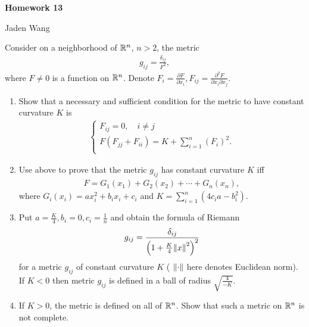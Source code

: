 \documentclass[12pt]{article}
\begin{document}
\centerline {\textsf{\textbf{\LARGE{Homework 13}}}}
\centerline {Jaden Wang}
\vspace{.15in}
\begin{problem}[Do Carmo 8.1]
Consider on a neighborhood of $ \mathbb{R}^{n}$, $ n>2$, the metric
 \begin{align*}
	g_{ij} = \frac{\delta_{ij}}{ F^2},
\end{align*}
where $ F \neq 0$ is a function on  $ \mathbb{R}^{n}$. Denote $ F_i = \frac{\partial F}{\partial x_i}, F_{ij} = \frac{\partial^2 F}{\partial { x_i} \partial x_j}  $.
\begin{enumerate}[label=(\alph*)]
	\item Show that a necessary and sufficient condition for the metric to have constant curvature $ K$ is
	 \begin{align*}
		\begin{cases}
			F_{ij} =0, \quad i\neq j\\
			F(F_{jj}+F_{ii}) = K + \sum_{ i= 1}^{ n} (F_i)^2 .\\
		\end{cases}
	\end{align*}
\item Use above to prove that the metric $ g_{ij}$ has constant curvature $ K$ iff
	 \begin{align*}
		F= G_1(x_1) + G_2(x_2) + \cdots + G_n(x_n),
	\end{align*}
	where $ G_i(x_i) = ax_i^2+b_i x_i + c_i$ and $ K = \sum_{ i= 1}^{ n} (4c_ia -b_i^2)$.
\item Put $ a = \frac{K}{4}, b_i =0, c_i =\frac{1}{n}$ and obtain the formula of Riemann
	\begin{align*}
		g_{ij} = \frac{\delta_{ij}}{ \left( 1+\frac{K}{4} {\left\lVert{ x}\right\rVert}^2  \right) ^2}
	\end{align*}
	for a metric $ g_{ij}$ of constant curvature $ K$ ( $ {\left\lVert{ \cdot }\right\rVert} $ here denotes Euclidean norm). If $ K<0$ then metric  $ g_{ij}$ is defined in a ball of radius $ \sqrt{ \frac{4}{-K}} $.
\item If $ K>0$, the metric is defined on all of  $ \mathbb{R}^{n}$. Show that such a metric on $ \mathbb{R}^{n}$ is not complete.
\end{enumerate}
\end{problem}
\end{document}
